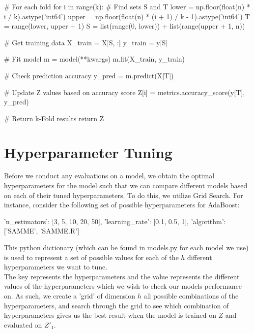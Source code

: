 \documentclass[fleqn]{article}
\begin{document}
    \begin{python}
    # For each fold
    for i in range(k):
        # Find sets S and T
        lower = np.floor(float(n) * i / k).astype('int64')
        upper = np.floor(float(n) * (i + 1) / k - 1).astype('int64')
        T = range(lower, upper + 1)
        S = list(range(0, lower)) + list(range(upper + 1, n))

        # Get training data
        X_train = X[S, :]
        y_train = y[S]

        # Fit model
        m = model(**kwargs)
        m.fit(X_train, y_train)

        # Check prediction accuracy
        y_pred = m.predict(X[T])

        # Update Z values based on accuracy score
        Z[i] = metrics.accuracy_score(y[T], y_pred)

    # Return k-Fold results
    return Z
    \end{python}

    \noindent

    \section{Hyperparameter Tuning}
    Before we conduct any evaluations on a model, we obtain the optimal hyperparameters for
    the model such that we can compare different models based on each of their tuned
    hyperparameters. To do this, we utilize Grid Search. For instance, consider the following
    set of possible hyperparameters for AdaBoost:
    \begin{python}
    {
        'n_estimators': [3, 5, 10, 20, 50],
        'learning_rate': [0.1, 0.5, 1],
        'algorithm': ['SAMME', 'SAMME.R']
    }
    \end{python}
    This python dictionary (which can be found in models.py for each model we use) is used
    to represent a set of possible values for each of the $ h $ different hyperparameters
    we want to tune. \\

    The key represents the hyperparameters and the value represents the
    different values of the hyperparameters which we wish to check our models performance
    on. As such, we create a 'grid' of dimension $ h $ all possible combinations of the
    hyperparameters, and search through the grid to see which combination of hyperparameters
    gives us the best result when the model is trained on $ Z $ and evaluated on $ Z'_1 $.\\
\end{document}
